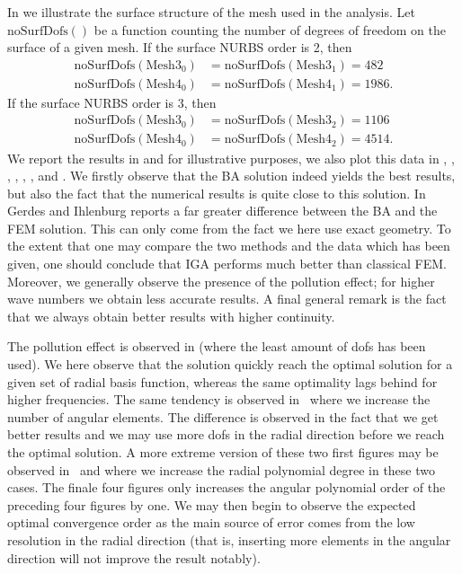 In  we illustrate the surface structure of the mesh used in the analysis. Let $\mathrm{noSurfDofs}()$ be a function counting the number of degrees of freedom on the surface of a given mesh. If the surface NURBS order is 2, then 
\begin{align*}
	\mathrm{noSurfDofs}(\mathrm{Mesh }3_0) &= \mathrm{noSurfDofs}(\mathrm{Mesh }3_1) = 482\\
	\mathrm{noSurfDofs}(\mathrm{Mesh }4_0) &= \mathrm{noSurfDofs}(\mathrm{Mesh }4_1) = 1986.
\end{align*}
If the surface NURBS order is 3, then 
\begin{align*}
	\mathrm{noSurfDofs}(\mathrm{Mesh }3_0) &= \mathrm{noSurfDofs}(\mathrm{Mesh }3_2) = 1106\\
	\mathrm{noSurfDofs}(\mathrm{Mesh }4_0) &= \mathrm{noSurfDofs}(\mathrm{Mesh }4_2) = 4514.
\end{align*}
We report the results in  and for illustrative purposes, we also plot this data in , , , , , ,  and . We firstly observe that the BA solution indeed yields the best results, but also the fact that the numerical results is quite close to this solution. In~\cite{Gerdes1999otp} Gerdes and Ihlenburg reports a far greater difference between the BA and the FEM solution. This can only come from the fact we here use exact geometry. To the extent that one may compare the two methods and the data which has been given, one should conclude that IGA performs much better than classical FEM. Moreover, we generally observe the presence of the pollution effect; for higher wave numbers we obtain less accurate results. A final general remark is the fact that we always obtain better results with higher continuity. 

The pollution effect is observed in  (where the least amount of dofs has been used). We here observe that the solution quickly reach the optimal solution for a given set of radial basis function, whereas the same optimality lags behind for higher frequencies. The same tendency is observed in~ where we increase the number of angular elements. The difference is observed in the fact that we get better results and we may use more dofs in the radial direction before we reach the optimal solution. A more extreme version of these two first figures may be observed in~ and  where we increase the radial polynomial degree in these two cases. The finale four figures only increases the angular polynomial order of the preceding four figures by one. We may then begin to observe the expected optimal convergence order as the main source of error comes from the low resolution in the radial direction (that is, inserting more elements in the angular direction will not improve the result notably). 


